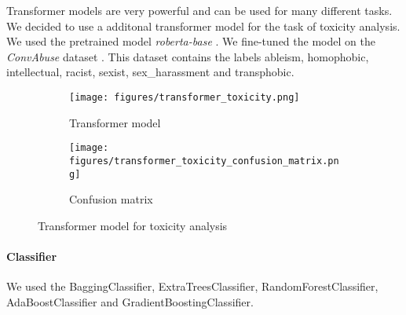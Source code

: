 Transformer models are very powerful and can be used for many different tasks. We decided to use a additonal transformer model
for the task of toxicity analysis. We used the pretrained model \textit{roberta-base} \cite{liu2019roberta}. We fine-tuned the model on the
\textit{ConvAbuse} dataset \cite{cercas-curry-etal-2021-convabuse}. This dataset contains the labels ableism, homophobic,
intellectual, racist, sexist, sex_harassment and transphobic.

\begin{figure}[h]
\begin{subfigure}[b]{0.5\textwidth}
  \centering
  \texttt{[image: figures/transformer\_toxicity.png]}
  \caption{Transformer model}
  \label{fig:transformer_toxicity}
\end{subfigure}
\begin{subfigure}[b]{0.5\textwidth}
  \centering
  \texttt{[image: figures/transformer\_toxicity\_confusion\_matrix.png]}
  \caption{Confusion matrix}
  \label{fig:transformer_toxicity_confusion_matrix}
\end{subfigure}
\caption{Transformer model for toxicity analysis}
\label{fig:transformer_toxicity}
\end{figure}


\paragraph{Classifier}

We used the BaggingClassifier, ExtraTreesClassifier, RandomForestClassifier, AdaBoostClassifier and GradientBoostingClassifier.
